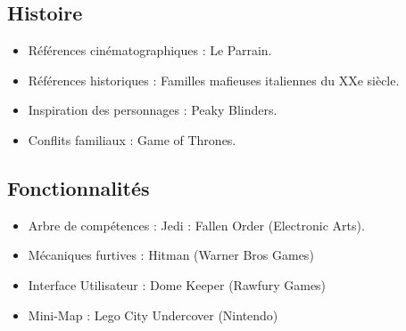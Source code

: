 \documentclass{report}
\begin{document}
\subsection{Histoire}
\begin{itemize}
    \item Références cinématographiques : Le Parrain.
    \item Références historiques : Familles mafieuses italiennes du XXe siècle.
    \item Inspiration des personnages : Peaky Blinders.
    \item Conflits familiaux : Game of Thrones.
\end{itemize}

\subsection{Fonctionnalités}
\begin{itemize}
    \item Arbre de compétences : Jedi : Fallen Order (Electronic Arts).
    \item Mécaniques furtives : Hitman (Warner Bros Games)
    \item Interface Utilisateur : Dome Keeper (Rawfury Games)
    \item Mini-Map : Lego City Undercover (Nintendo)
    
\end{itemize}

\newpage
\end{document}
